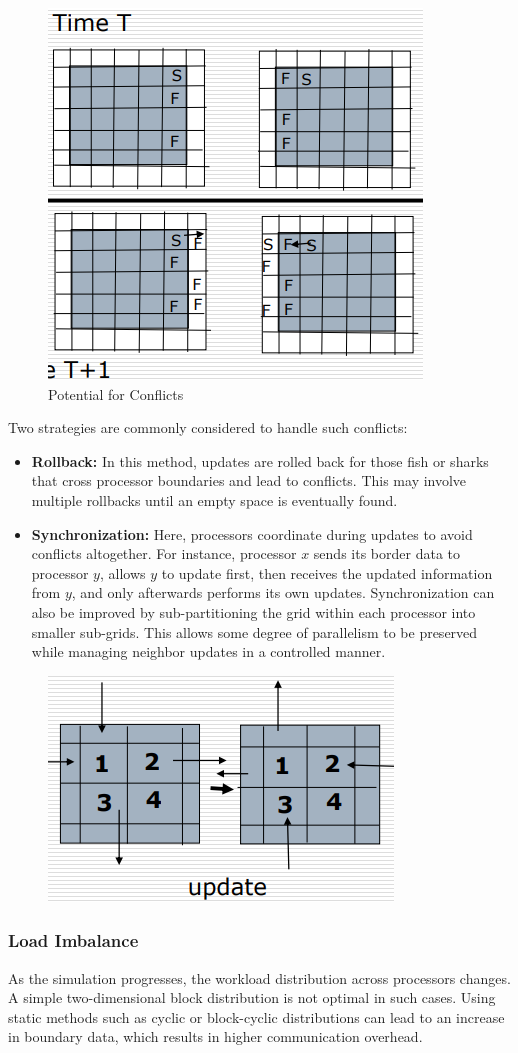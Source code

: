 \documentclass[12pt]{book}
\begin{document}
\begin{figure}
    \centering
    \includegraphics[width=0.5\linewidth]{images/GOL.png}
    \caption{Potential for Conflicts}
    \label{fig:GOLpoc}
\end{figure}
Two strategies are commonly considered to handle such conflicts:
\begin{itemize}
    \item \textbf{Rollback:} In this method, updates are rolled back for those fish or sharks that cross processor boundaries and lead to conflicts. This may involve multiple rollbacks until an empty space is eventually found.
    \item \textbf{Synchronization:} Here, processors coordinate during updates to avoid conflicts altogether. For instance, processor $x$ sends its border data to processor $y$, allows $y$ to update first, then receives the updated information from $y$, and only afterwards performs its own updates. Synchronization can also be improved by sub-partitioning the grid within each processor into smaller sub-grids. This allows some degree of parallelism to be preserved while managing neighbor updates in a controlled manner.
\end{itemize}

\begin{figure}[ht]
    \centering
    \includegraphics[width=0.5\linewidth]{images/updgol.png}
\end{figure}
\subsubsection*{Load Imbalance}
As the simulation progresses, the workload distribution across processors changes. A simple two-dimensional block distribution is not optimal in such cases. Using static methods such as cyclic or block-cyclic distributions can lead to an increase in boundary data, which results in higher communication overhead.
\end{document}
